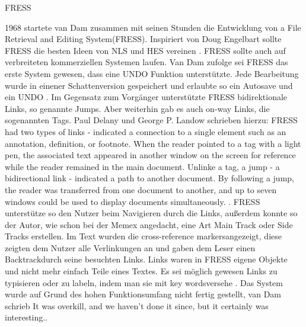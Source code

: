 \begin{section}{FRESS}
\label{sec:fress}
	
1968 startete van Dam zusammen mit seinen Stunden die Entwicklung von \glqq a File Retrieval and Editing System\grqq{ }(FRESS). Inspiriert von Doug Engelbart sollte FRESS die besten Ideen von NLS und HES vereinen \cite[S.887 und 890]{Dam1988}. FRESS sollte auch auf verbreiteten kommerziellen Systemen laufen. Van Dam zufolge sei FRESS das erste System gewesen, dass eine UNDO Funktion unterstützte. Jede Bearbeitung wurde in einener Schattenversion gespeichert und erlaubte so ein Autosave und ein UNDO \cite[S.891]{Dam1988}. Im Gegensatz zum Vorgänger unterstützte FRESS bidirektionale Links, so genannte \glqq Jumps\grqq{ }. Aber weiterhin gab es auch on-way Links, die sogenannten \glqq Tags\grqq{ }. Paul Delany und George P. Landow schrieben hierzu: \glqq FRESS had two types of links - indicated a connection to a single element such as an annotation, definition, or footnote. When the reader pointed to a tag with a light pen, the associated text appeared in another window on the screen for reference while the reader remained in the main document. Unlinke a tag, a jump - a bidirectional link - indicated a path to another document. By following a jump, the reader was transferred from one document to another, and up to seven windows could be used to display documents simultaneously. \grqq{ }\cite[S.68]{GeorgeLandow1995}. FRESS unterstütze so den Nutzer beim Navigieren durch die Links, außerdem konnte so der Autor, wie schon bei der Memex angedacht, eine Art Main Track oder Side Tracks erstellen. Im Text wurden die \glqq cross-reference markers\grqq{ }angezeigt, diese zeigten dem Nutzer alle Verlinkungen an und gaben dem Leser einen \glqq Backtrack\grqq{ }durch seine besuchten Links. Links waren in FRESS eigene Objekte und nicht mehr einfach Teile eines Textes. Es sei möglich gewesen Links zu typisieren oder zu labeln, indem man sie mit \glqq key words\grqq{ }versehe \cite[S.891]{Dam1988}. Das System wurde auf Grund des hohen Funktionsumfang nicht fertig gestellt, van Dam schrieb \glqq It was overkill, and we haven’t done it since, but it certainly was interesting.\grqq{ }\cite[S.891]{Dam1988}.

\end{section}

